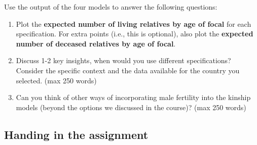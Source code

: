 \documentclass{article}
\begin{document}
    Use the output of the four models to answer the following questions:

    \begin{enumerate}
     
    \item Plot the \textbf{expected number of living relatives by age of focal} for each specification. For extra points (i.e., this is optional), also plot the \textbf{expected number of deceased relatives by age of focal}.
    \item Discuss 1-2 key insights, when would you use different specifications? Consider the specific context and the data available for the country you selected. (max 250 words)
    \item Can you think of other ways of incorporating male fertility into the kinship models (beyond the options we discussed in the course)?  (max 250 words)
       \end{enumerate}  




\subsection{Handing in the assignment}
\end{document}
